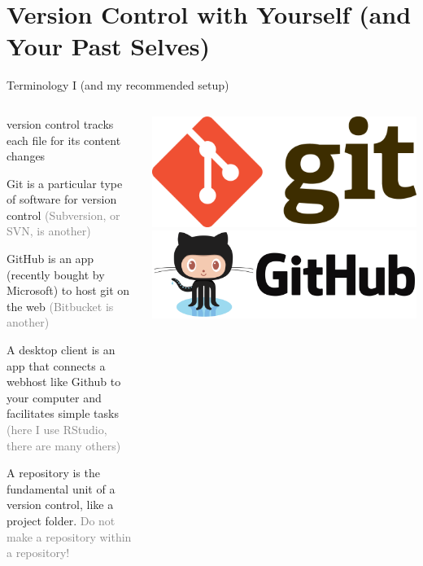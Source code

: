 \documentclass[ignorenonframetext,notes, 10pt, aspectratio=169]{beamer}
\begin{document}
\section{Version Control with Yourself (and Your Past Selves)}

\begin{frame}{Terminology I (and my recommended setup)}
\begin{columns}[T]
\begin{column}{0.6\textwidth}
\begin{wideitemize}
\item version control \alert{tracks} each file for its content changes
\item \alert{Git} is a particular type of software for version control \textcolor{gray}{(Subversion, or SVN, is another)}
\item \alert{GitHub} is an app (recently bought by Microsoft) to host git on the web \textcolor{gray}{(Bitbucket is another)}
\item A \alert{desktop client} is an app that connects a webhost like Github to your computer and facilitates simple tasks \textcolor{gray}{(here I use \alert{RStudio}, there are many others)}
\item A \alert{repository} is the fundamental unit of a version control, like a project folder. \pause \textcolor{gray}{Do not make a repository within a repository!}
\end{wideitemize}
\end{column}
\begin{column}{0.4\textwidth}
\includegraphics[width = \linewidth]{Git-Logo-2Color.png}
\smallskip
\includegraphics[width = \linewidth]{github-logo-1.png}

\end{column}
\end{columns}
\end{frame}
\end{document}
